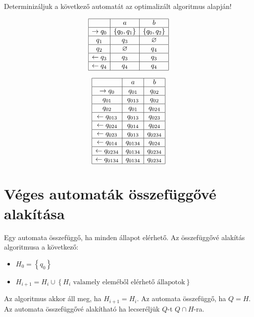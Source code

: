 \begin{example}
	Determinizáljuk a következő automatát az optimalizált algoritmus alapján!
	
	\begin{multicols}{2}
		\begin{table}[H]
			\centering
			$$
			\begin{array}{|c|c|c|}
				\hline
				& a & b \\
				\hline
				\rightarrow q_0 & \left\lbrace q_0, q_1 \right\rbrace  & \left\lbrace q_0, q_2 \right\rbrace  \\
				\hline
				q_1 & q_3 & \varnothing  \\
				\hline
				q_2 & \varnothing & q_4   \\
				\hline
				\leftarrow q_3 & q_3 & q_3   \\
				\hline
				\leftarrow q_4 & q_4 & q_4   \\
				\hline
			\end{array}
			$$
		\end{table}
		\begin{table}[H]
			\centering
			$$
			\begin{array}{|c|c|c|}
				\hline
				& a & b \\
				\hline
				\rightarrow q_0 & q_{01} & q_{02} \\
				\hline
				q_{01} & q_{013} & q_{02}  \\
				\hline
				q_{02} & q_{01} & q_{024}   \\
				\hline
				\leftarrow q_{013} & q_{013} & q_{023}   \\
				\hline
				\leftarrow q_{024} & q_{014} & q_{024}   \\
				\hline
				\leftarrow q_{023} & q_{013} & q_{0234}   \\
				\hline
				\leftarrow q_{014} & q_{0134} & q_{024}   \\
				\hline
				\leftarrow q_{0234} & q_{0134} & q_{0234}   \\
				\hline
				\leftarrow q_{0134} & q_{0134} & q_{0234}   \\
				\hline
			\end{array}
			$$
		\end{table}
	\end{multicols}
\end{example}
\newpage
\section{Véges automaták összefüggővé alakítása}
Egy automata összefüggő, ha minden állapot elérhető. Az összefüggővé alakítás algoritmusa a következő:
\begin{itemize}
	\item $ H_0 = \left\lbrace q_0 \right\rbrace $
	\item $ H_{i+1} = H_i \cup \left\lbrace H_i \text{ valamely eleméből elérhető állapotok} \right\rbrace $ 
\end{itemize}
Az algoritmus akkor áll meg, ha $ H_{i+1} = H_i $. Az automata összefüggő, ha $ Q = H $. Az automata összefüggővé alakítható ha lecseréljük $ Q $-t $Q \cap H$-ra.

